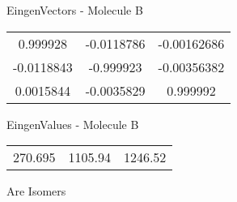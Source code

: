 \begin{multicols}{2}
\begin{center}
\vtab
 EingenVectors - Molecule B     \\
\vtab
\begin{tabular}{|c c c|}
0.999928	 & 	-0.0118786	 & 	-0.00162686	 \\
-0.0118843	 & 	-0.999923	 & 	-0.00356382	 \\
0.0015844	 & 	-0.0035829	 & 	0.999992
\end{tabular}

\vtab
 EingenValues - Molecule B     \\
\vtab
\begin{tabular}{|c c c|}
270.695	 & 	1105.94	 & 	1246.52
\end{tabular}

\end{center}
\end{multicols}
\begin{center}
\vtab
\vtab
\textcolor{NavyBlue}{\Large Are Isomers}
\end{center}
\newpage

